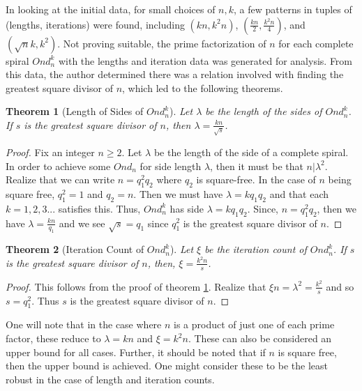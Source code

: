 \documentclass[11pt]{amsart}
\theoremstyle{mydef}
\newtheorem{thm}{Theorem}[section]
\begin{document}
In looking at the initial data, for small choices of $n, k$, a few patterns in tuples of (lengths, iterations) were found, including $(kn, k^2 n)$, $(\frac{kn}{2}, \frac{k^2 n}{4})$, and $(\sqrt{n}k, k^2)$. Not proving suitable, the prime factorization of $n$ for each complete spiral $Ond^k_n$ with the lengths and iteration data was generated for analysis. From this data, the author determined there was a relation involved with finding the greatest square divisor of $n$, which led to the following theorems.

\begin{thm}[Length of Sides of $Ond^k_n$]
Let $\lambda$ be the length of the sides of $Ond^k_n$. If $s$ is the greatest square divisor of $n$, then $\lambda = \frac{kn}{\sqrt{s}}$.
\label{lenthm}
\end{thm}

\begin{proof}
Fix an integer $n \ge 2$.  Let $\lambda$ be the length of the side of a complete spiral. In order to achieve some $Ond_n$ for side length $\lambda$, then it must be that $n \vert \lambda^2$. Realize that we can write $n = q^2_1 q_2$ where $q_2$ is square-free. In the case of $n$ being square free, $q^2_1 = 1$ and $q_2 = n$. Then we must have $\lambda = k q_1 q_2$ and that each $k = 1, 2, 3...$ satisfies this. Thus, $Ond^k_n$ has side $\lambda = k q_1 q_2$. Since, $n = q^2_1 q_2$, then we have $\lambda = \frac{kn}{q_1}$ and we see $\sqrt{s} = q_1$ since $q^2_1$ is the greatest square divisor of $n$.
\end{proof}

\begin{thm}[Iteration Count of $Ond^k_n$]
Let $\xi$ be the iteration count  of $Ond^k_n$. If $s$ is the greatest square divisor of $n$,  then, $\xi = \frac{k^2n}{s}$.
\end{thm}


\begin{proof}
This follows from the proof of theorem \ref{lenthm}. Realize that $\xi n = \lambda^2 = \frac{k^2}{s}$ and so $s = q^2_1$. Thus $s$ is the greatest square divisor of $n$.
\end{proof}



One will note that in the case where $n$ is a product of just one of each prime factor, these reduce to $\lambda = k n$ and $\xi = k^2 n$. These can also be considered an upper bound for all cases. Further, it should be noted that if $n$ is square free, then the upper bound is achieved. One might consider these to be the least robust in the case of length and iteration counts.
\end{document}

